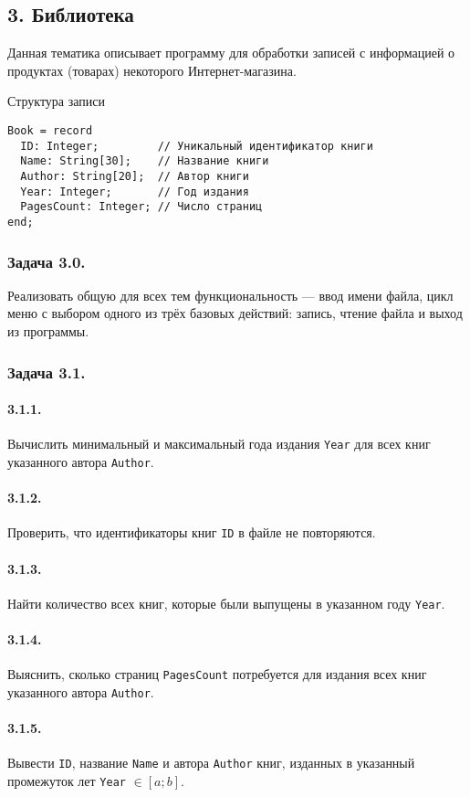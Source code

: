 \documentclass[12pt,a4paper]{report}
\begin{document}
\subsection*{3. Библиотека}
Данная тематика описывает программу для обработки записей с информацией о продуктах (товарах) некоторого Интернет-магазина.

Структура записи
\begin{verbatim}
Book = record
  ID: Integer;         // Уникальный идентификатор книги
  Name: String[30];    // Название книги
  Author: String[20];  // Автор книги
  Year: Integer;       // Год издания
  PagesCount: Integer; // Число страниц
end;
\end{verbatim}

\subsubsection{Задача 3.0.} Реализовать общую для всех тем функциональность --- ввод имени файла, цикл меню с выбором одного из трёх базовых действий: запись, чтение файла и выход из программы.
\subsubsection{Задача 3.1.}
\paragraph{3.1.1.} Вычислить минимальный и максимальный года издания \texttt{Year} для всех книг указанного автора \texttt{Author}.
\paragraph{3.1.2.} Проверить, что идентификаторы книг \texttt{ID} в файле не повторяются.
\paragraph{3.1.3.} Найти количество всех книг, которые были выпущены в указанном году \texttt{Year}.
\paragraph{3.1.4.} Выяснить, сколько страниц \texttt{PagesCount} потребуется для издания всех книг указанного автора \texttt{Author}.
\paragraph{3.1.5.} Вывести \texttt{ID}, название \texttt{Name} и автора \texttt{Author} книг, изданных в указанный промежуток лет \texttt{Year} $\in [a; b]$.
\end{document}
